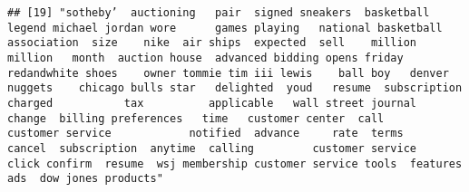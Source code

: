 \documentclass[
]{article}
\begin{document}
\begin{verbatim}
## [19] "sotheby’  auctioning   pair  signed sneakers  basketball legend michael jordan wore      games playing   national basketball association  size    nike  air ships  expected  sell    million   million   month  auction house  advanced bidding opens friday  redandwhite shoes    owner tommie tim iii lewis    ball boy   denver nuggets    chicago bulls star   delighted  youd   resume  subscription    charged           tax          applicable   wall street journal           change  billing preferences   time   customer center  call         customer service            notified  advance     rate  terms           cancel  subscription  anytime  calling         customer service         click confirm  resume  wsj membership customer service tools  features ads  dow jones products"                                                                                                                                                                                                                                                                                                                                                                                                                                                                                                                                                                                                                                                                                                                                                                                                                                                                                                                                                                                                                                                                                                                                                                                                                                                                                                                                                                                                                                                                                                                                                                                                                                                                                                                                                                                                                                                                                                                                                                                                                                                                                                                                                                                                                                                                                                                                                                                                                                                                                                                                                                                                                                     
\end{verbatim}
\end{document}

